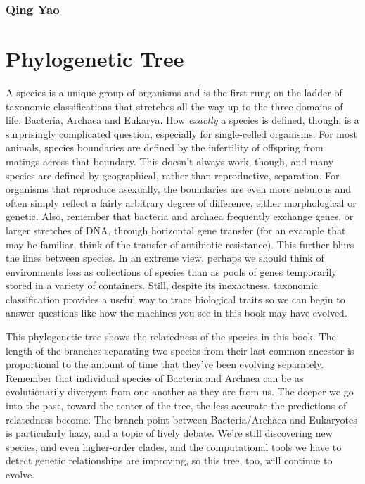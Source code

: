 \documentclass[]{tufte-book}
\begin{document}
\hypertarget{qing_yao}{\subsection{Qing Yao}\label{qing_yao}}

\chapter{Phylogenetic Tree}\label{phylogenetic-tree}

A species is a unique group of organisms and is the first rung on the
ladder of taxonomic classifications that stretches all the way up to the
three domains of life: Bacteria, Archaea and Eukarya. How \emph{exactly}
a species is defined, though, is a surprisingly complicated question,
especially for single-celled organisms. For most animals, species
boundaries are defined by the infertility of offspring from matings
across that boundary. This doesn't always work, though, and many species
are defined by geographical, rather than reproductive, separation. For
organisms that reproduce asexually, the boundaries are even more
nebulous and often simply reflect a fairly arbitrary degree of
difference, either morphological or genetic. Also, remember that
bacteria and archaea frequently exchange genes, or larger stretches of
DNA, through horizontal gene transfer (for an example that may be
familiar, think of the transfer of antibiotic resistance). This further
blurs the lines between species. In an extreme view, perhaps we should
think of environments less as collections of species than as pools of
genes temporarily stored in a variety of containers. Still, despite its
inexactness, taxonomic classification provides a useful way to trace
biological traits so we can begin to answer questions like how the
machines you see in this book may have evolved.

This phylogenetic tree shows the relatedness of the species in this
book. The length of the branches separating two species from their last
common ancestor is proportional to the amount of time that they've been
evolving separately. Remember that individual species of Bacteria and
Archaea can be as evolutionarily divergent from one another as they are
from us. The deeper we go into the past, toward the center of the tree,
the less accurate the predictions of relatedness become. The branch
point between Bacteria/Archaea and Eukaryotes is particularly hazy, and
a topic of lively debate. We're still discovering new species, and even
higher-order clades, and the computational tools we have to detect
genetic relationships are improving, so this tree, too, will continue to
evolve.
\end{document}
